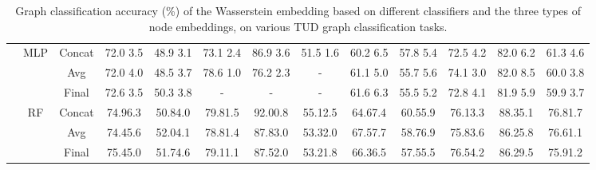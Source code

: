 \documentclass[table]{article} \usepackage{iclr2021_conference,times}
\begin{document}
\begin{landscape}
\begin{table}
{\begin{tabular}{c|c|c|cccccccccc|}
\cline{2-13}
                       & \multirow{3}{*}{MLP}          & Concat & 72.0  3.5 & 48.9  3.1 & 73.1  2.4 & 86.9  3.6 & 51.5  1.6 & 60.2  6.5 & 57.8  5.4 & 72.5  4.2 & 82.0  6.2  & 61.3  4.6  \\ 
\cline{3-3}
                       &                               & Avg    & 72.0  4.0 & 48.5  3.7 & 78.6  1.0 & 76.2  2.3 & -          & 61.1  5.0 & 55.7  5.6 & 74.1  3.0 & 82.0  8.5  & 60.0  3.8  \\ 
\cline{3-3}
                       &                               & Final  & 72.6  3.5 & 50.3  3.8 & -          & -          & -          & 61.6  6.3 & 55.5  5.2 & 72.8  4.1 & 81.9  5.9  & 59.9  3.7  \\ 
\cline{2-13}
                       & \multirow{3}{*}{RF}           & Concat & 74.96.3   & 50.84.0   & 79.81.5   & 92.00.8   & 55.12.5   & 64.67.4   & 60.55.9   & 76.13.3   & 88.35.1    & 76.81.7    \\ 
\cline{3-3}
                       &                               & Avg    & 74.45.6   & 52.04.1   & 78.81.4   & 87.83.0   & 53.32.0   & 67.57.7   & 58.76.9   & 75.83.6   & 86.25.8    & 76.61.1    \\ 
\cline{3-3}
                       &                               & Final  & 75.45.0   & 51.74.6   & 79.11.1   & 87.52.0   & 53.21.8   & 66.36.5   & 57.55.5   & 76.54.2   & 86.29.5    & 75.91.2    \\
\cline{2-13}
\end{tabular}}
\caption{Graph classification accuracy (\%) of the Wasserstein embedding based on different classifiers and the three types of node embeddings, on various TUD graph classification tasks.}
\label{table:Results_TUD_All}
\end{table}
\end{landscape}
\end{document}

